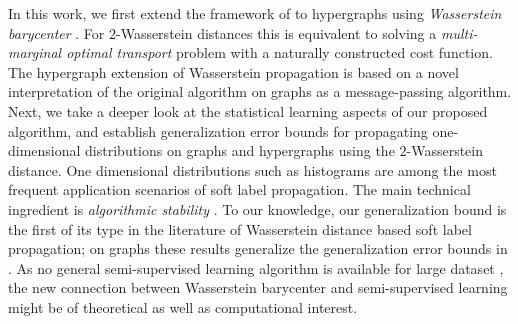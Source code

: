 \documentclass[letterpaper]{article} %
\begin{document}
In this work, we first extend the framework of \cite{Solomon:2014} to hypergraphs using \textit{Wasserstein barycenter} \cite{Wasserstein_Barycenter,Hypergraph_Asoodeh}. For $2$-Wasserstein distances this is equivalent to solving a \emph{multi-marginal optimal transport} \cite{CE2010} problem with a naturally constructed cost function. The hypergraph extension of Wasserstein propagation is based on a novel interpretation of the original algorithm on graphs \cite{Solomon:2014} as a message-passing algorithm. Next, we take a deeper look at the statistical learning aspects of our proposed algorithm, and establish generalization error bounds for propagating one-dimensional distributions on graphs and hypergraphs using the $2$-Wasserstein distance. One dimensional distributions such as histograms are among the most frequent application scenarios of soft label propagation. The main technical ingredient is \textit{algorithmic stability} \cite{Algorithmic_Stability}. To our knowledge, our generalization bound is the first of its type in the literature of Wasserstein distance based soft label propagation; on graphs these results generalize the generalization error bounds in \cite{Belkin2004}. As no general semi-supervised learning algorithm is available for large dataset \cite{Label_Propa_100}, the new connection between Wasserstein barycenter and semi-supervised learning might be of theoretical as well as computational interest. %

\end{document}
